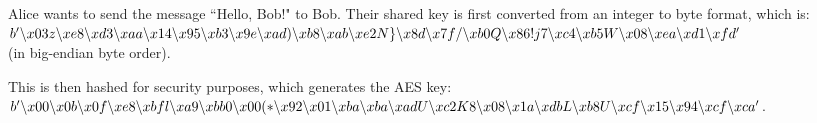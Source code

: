 \documentclass[12pt,a4paper]{article}
\begin{document}
Alice wants to send the message ``Hello, Bob!" to Bob. 
Their shared key is first converted from an integer to byte format, which is: \\
{\footnotesize $b' \char`\\x03z \char`\\xe8 \char`\\xd3 \char`\\xaa \char`\\x14 \char`\\x95 \char`\\xb3 \char`\\x9e \char`\\xad) \char`\\xb8 \char`\\xab \\ 
\char`\\xe2N\} \char`\\x8d \char`\\x7f/ \char`\\xb0Q \char`\\x86!j7 \char`\\xc4 \char`\\xb5W \char`\\x08 \char`\\xea \char`\\xd1 \char`\\xfd '$} \\
(in big-endian byte order). 

This is then hashed for security purposes, which generates the AES key: \\
{\footnotesize $b' \char`\\x00 \char`\\x0b \char`\\x0f \char`\\xe8 \char`\\xbfl \char`\\xa9 \char`\\xbb0 \char`\\x00(* \char`\\x92 \char`\\x01 \char`\\xba \char`\\xba \\ 
\char`\\xadU \char`\\xc2K8 \char`\\x08 \char`\\x1a \char`\\xdbL \char`\\xb8U \char`\\xcf \char`\\x15 \char`\\x94 \char`\\xcf \char`\\xca '$}. 
\end{document}
